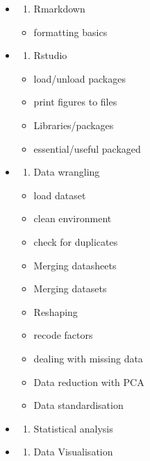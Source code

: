 \documentclass[
]{book}
\providecommand{\tightlist}{%
  \setlength{\itemsep}{0pt}\setlength{\parskip}{0pt}}
\begin{document}
\begin{itemize}
\item
  \begin{enumerate}
  \def\labelenumi{\arabic{enumi}.}
  \tightlist
  \item
    Rmarkdown
  \end{enumerate}

  \begin{itemize}
  \tightlist
  \item
    formatting basics
  \end{itemize}
\item
  \begin{enumerate}
  \def\labelenumi{\arabic{enumi}.}
  \setcounter{enumi}{1}
  \tightlist
  \item
    Rstudio
  \end{enumerate}

  \begin{itemize}
  \tightlist
  \item
    load/unload packages
  \item
    print figures to files
  \item
    Libraries/packages
  \item
    essential/useful packaged
  \end{itemize}
\item
  \begin{enumerate}
  \def\labelenumi{\arabic{enumi}.}
  \setcounter{enumi}{2}
  \tightlist
  \item
    Data wrangling
  \end{enumerate}

  \begin{itemize}
  \tightlist
  \item
    load dataset
  \item
    clean environment
  \item
    check for duplicates
  \item
    Merging datasheets
  \item
    Merging datasets
  \item
    Reshaping
  \item
    recode factors
  \item
    dealing with missing data
  \item
    Data reduction with PCA
  \item
    Data standardisation
  \end{itemize}
\item
  \begin{enumerate}
  \def\labelenumi{\arabic{enumi}.}
  \setcounter{enumi}{3}
  \tightlist
  \item
    Statistical analysis
  \end{enumerate}
\item
  \begin{enumerate}
  \def\labelenumi{\arabic{enumi}.}
  \setcounter{enumi}{4}
  \tightlist
  \item
    Data Visualisation
  \end{enumerate}


\end{itemize}
\end{document}
